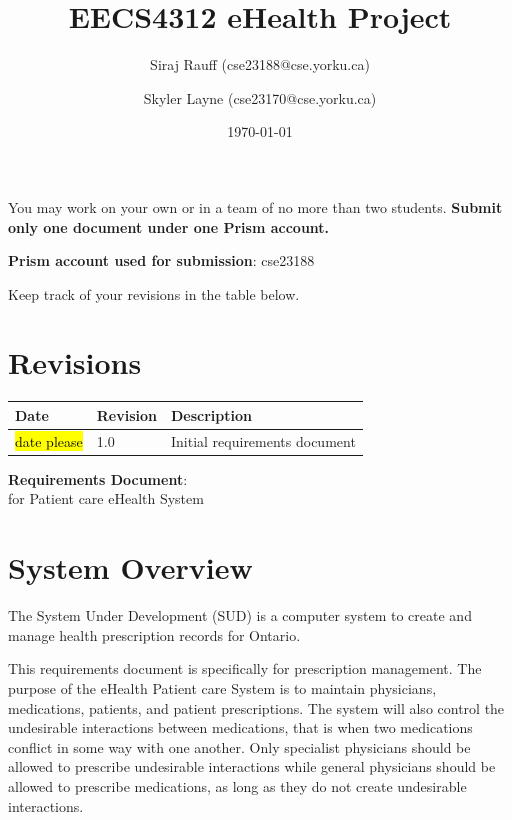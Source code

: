 \documentclass[fontsize=12pt,paper=letter,twoside]{scrartcl}
\title{EECS4312 eHealth Project}
\author{{Siraj Rauff (cse23188@cse.yorku.ca)}
\and {Skyler Layne (cse23170@cse.yorku.ca)}
}
\date{\today} %
\begin{document}
\maketitle

\noindent You may work on your own or in a team of no more than two students. \textbf{Submit only one document under one Prism account.} 

\bigskip
\noindent \textbf{Prism account used for submission}: cse23188

\bigskip\noindent
Keep track of your revisions in the table below.

\section*{Revisions}
\begin{tabular}{|l|l|p{3in}|}
\hline
Date & Revision& Description \\ 
\hline

\hl{date please}

& 1.0       
& Initial requirements document\\ 
\hline
\end{tabular}

\newpage

\vspace*{2in}
\begin{center}
\huge{\textbf{Requirements Document}:\\ for Patient care eHealth System}
\end{center}

\newpage

\tableofcontents
\listoffigures
\listoftables
\newpage


\section{System Overview}

The System Under Development (SUD) is a computer system to create and manage health prescription records for Ontario.

This requirements document is specifically for prescription management. The purpose of the eHealth Patient care System is to maintain physicians, medications, patients, and patient prescriptions. The system will also control the undesirable interactions between medications, that is when two medications conflict in some way with one another. Only specialist physicians should be allowed to prescribe undesirable interactions while general physicians should be allowed to prescribe medications, as long as they do not create undesirable interactions. 
\end{document}
